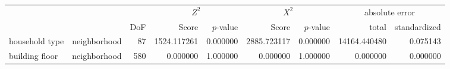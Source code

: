 \begin{tabular}{ll|r|rr|rr|rr}
\toprule
 &  &  & \multicolumn{2}{|c}{$Z^2$} & \multicolumn{2}{|c}{$X^2$} & \multicolumn{2}{|c}{absolute error} \\
 &  & DoF & Score & $p$-value & Score & $p$-value & total & standardized \\
\midrule
household type & neighborhood & 87 & 1524.117261 & 0.000000 & 2885.723117 & 0.000000 & 14164.440480 & 0.075143 \\
\cline{1-9}
building floor & neighborhood & 580 & 0.000000 & 1.000000 & 0.000000 & 1.000000 & 0.000000 & 0.000000 \\
\cline{1-9}
\bottomrule
\end{tabular}
